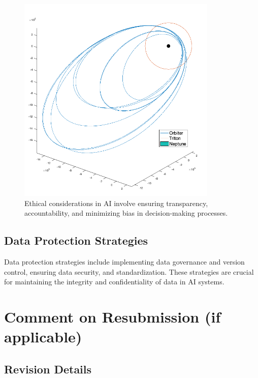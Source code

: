 \documentclass[a4paper,12pt]{article}
\begin{document}
\begin{figure}[htbp]
    \centering
    \includegraphics[width=0.85\textwidth]{images/explanations_on_the_management_of_ethical_issues_and_data_protection_img_1.png}
    \caption{Ethical considerations in AI involve ensuring transparency, accountability, and minimizing bias in decision-making processes.}
    \label{fig:explanations_on_the_management_of_ethical_issues_and_data_protection_1}
\end{figure}

\subsection{Data Protection Strategies}

Data protection strategies include implementing data governance and version control, ensuring data security, and standardization. These strategies are crucial for maintaining the integrity and confidentiality of data in AI systems.

\newpage

\section{Comment on Resubmission (if applicable)}

\subsection{Revision Details}
\end{document}
